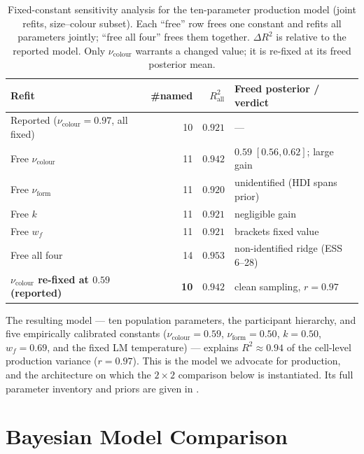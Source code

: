 \documentclass[man,floatsintext]{apa7}
\begin{document}
\begin{table}[htbp]
\centering
\caption{Fixed-constant sensitivity analysis for the ten-parameter production model (joint refits, size--colour subset).
Each ``free'' row frees one constant and refits all parameters jointly; ``free all four'' frees them together.
$\Delta R^2$ is relative to the reported model.
Only $\nu_\text{colour}$ warrants a changed value; it is re-fixed at its freed posterior mean.}
\label{tab:semval-refit}
\small
\begin{tabular}{lrrl}
\hline
Refit & \#named & $R^2_{\text{all}}$ & Freed posterior / verdict \\
\hline
Reported ($\nu_\text{colour}=0.97$, all fixed) & 10 & $0.921$ & --- \\
Free $\nu_\text{colour}$ & 11 & $0.942$ & $0.59\;[0.56,0.62]$; large gain \\
Free $\nu_\text{form}$ & 11 & $0.920$ & unidentified (HDI spans prior) \\
Free $k$ & 11 & $0.921$ & negligible gain \\
Free $w_f$ & 11 & $0.921$ & brackets fixed value \\
Free all four & 14 & $0.953$ & non-identified ridge (ESS 6--28) \\
\textbf{$\nu_\text{colour}$ re-fixed at $0.59$ (reported)} & \textbf{10} & $\mathbf{0.942}$ & clean sampling, $r = 0.97$ \\
\hline
\end{tabular}
\end{table}

The resulting model --- ten population parameters, the participant hierarchy, and five empirically calibrated constants ($\nu_\text{colour}=0.59$, $\nu_\text{form}=0.50$, $k=0.50$, $w_f=0.69$, and the fixed LM temperature) --- explains $R^2 \approx 0.94$ of the cell-level production variance ($r = 0.97$).
This is the model we advocate for production, and the architecture on which the $2 \times 2$ comparison below is instantiated.
Its full parameter inventory and priors are given in .

\section{Bayesian Model Comparison}
\label{sec:modelcomparison}
\end{document}
